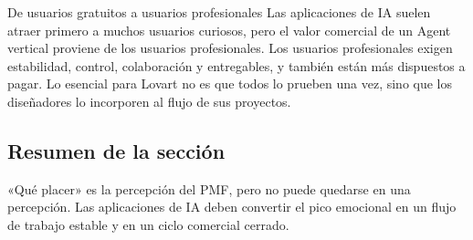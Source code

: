 \begin{knowledgebox}{De usuarios gratuitos a usuarios profesionales}
Las aplicaciones de IA suelen atraer primero a muchos usuarios curiosos, pero el valor comercial de un Agent vertical proviene de los usuarios profesionales. Los usuarios profesionales exigen estabilidad, control, colaboración y entregables, y también están más dispuestos a pagar. Lo esencial para Lovart no es que todos lo prueben una vez, sino que los diseñadores lo incorporen al flujo de sus proyectos.
\end{knowledgebox}

\subsection{Resumen de la sección}

«Qué placer» es la percepción del PMF, pero no puede quedarse en una percepción. Las aplicaciones de IA deben convertir el pico emocional en un flujo de trabajo estable y en un ciclo comercial cerrado.
